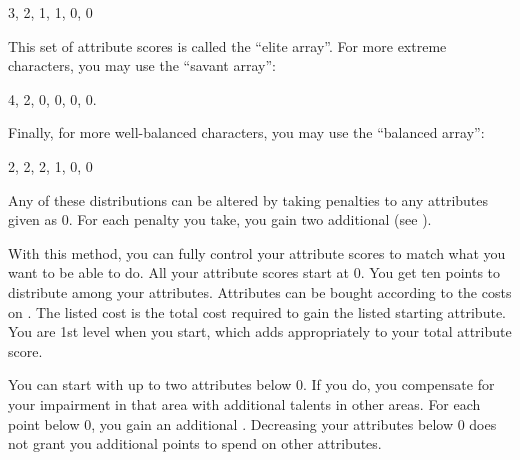             3, 2, 1, 1, 0, 0

            This set of attribute scores is called the ``elite array''.
            For more extreme characters, you may use the ``savant array'':

            4, 2, 0, 0, 0, 0.

            Finally, for more well-balanced characters, you may use the ``balanced array'':

            2, 2, 2, 1, 0, 0

            Any of these distributions can be altered by taking penalties to any attributes given as 0.
            For each penalty you take, you gain two additional  (see ).

                With this method, you can fully control your attribute scores to match what you want to be able to do.
                All your attribute scores start at 0.
                You get ten points to distribute among your attributes.
                Attributes can be bought according to the costs on .
                The listed cost is the total cost required to gain the listed starting attribute.
                You are 1st level when you start, which adds appropriately to your total attribute score.

                \label{Impaired Attributes}
                You can start with up to two attributes below 0.
                If you do, you compensate for your impairment in that area with additional talents in other areas.
                For each point below 0, you gain an additional .
                Decreasing your attributes below 0 does not grant you additional points to spend on other attributes.

